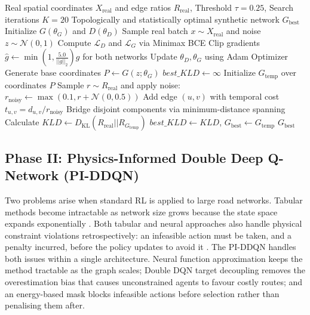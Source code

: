 \documentclass[conference]{IEEEtran}
\begin{document}
\begin{algorithm}[ht]
\caption{Optimized SG-GAN Synthesis with KLD Heuristic Search}
\label{algo:sg_gan}
\begin{algorithmic}[1]
\REQUIRE Real spatial coordinates $X_{\text{real}}$ and edge ratios $R_{\text{real}}$, Threshold $\tau=0.25$, Search iterations $K=20$
\ENSURE Topologically and statistically optimal synthetic network $G_{\text{best}}$
\STATE Initialize $G(\theta_G)$ and $D(\theta_D)$
    \STATE Sample real batch $x \sim X_{\text{real}}$ and noise $z \sim \mathcal{N}(0, 1)$
    \STATE Compute $\mathcal{L}_D$ and $\mathcal{L}_G$ via Minimax BCE
    \STATE Clip gradients $\hat{g} \leftarrow \min \left( 1, \frac{5.0}{||g||_2} \right) g$ for both networks
    \STATE Update $\theta_D, \theta_G$ using Adam Optimizer
\ENDFOR
\STATE Generate base coordinates $P \leftarrow G(z; \theta_G)$
\STATE $best\_KLD \leftarrow \infty$
    \STATE Initialize $G_{\text{temp}}$ over coordinates $P$
            \STATE Sample $r \sim R_{\text{real}}$ and apply noise: $r_{\text{noisy}} \leftarrow \max(0.1, r + \mathcal{N}(0, 0.5))$
            \STATE Add edge $(u, v)$ with temporal cost $t_{u,v} = d_{u,v}/r_{\text{noisy}}$
        \ENDIF
    \ENDFOR
        \STATE Bridge disjoint components via minimum-distance spanning
    \ENDWHILE
    \STATE Calculate $KLD \leftarrow D_{\text{KL}}(R_{\text{real}} || R_{G_{\text{temp}}})$
        \STATE $best\_KLD \leftarrow KLD$, \quad $G_{\text{best}} \leftarrow G_{\text{temp}}$
    \ENDIF
\ENDFOR
\RETURN $G_{\text{best}}$
\end{algorithmic}
\end{algorithm}

\subsection*{Phase II: Physics-Informed Double Deep Q-Network (PI-DDQN)}
\label{sec:pi_ddqn}
\setcounter{subsubsection}{0}

Two problems arise when standard RL is applied to large road networks. Tabular methods become intractable as network size grows because the state space expands exponentially \cite{sutton2018rl}. Both tabular and neural approaches also handle physical constraint violations retrospectively: an infeasible action must be taken, and a penalty incurred, before the policy updates to avoid it \cite{mnih2015dqn}. The PI-DDQN handles both issues within a single architecture. Neural function approximation keeps the method tractable as the graph scales; Double DQN target decoupling \cite{van2016deep, thrun1993issues} removes the overestimation bias that causes unconstrained agents to favour costly routes; and an energy-based mask blocks infeasible actions before selection rather than penalising them after.
\end{document}
